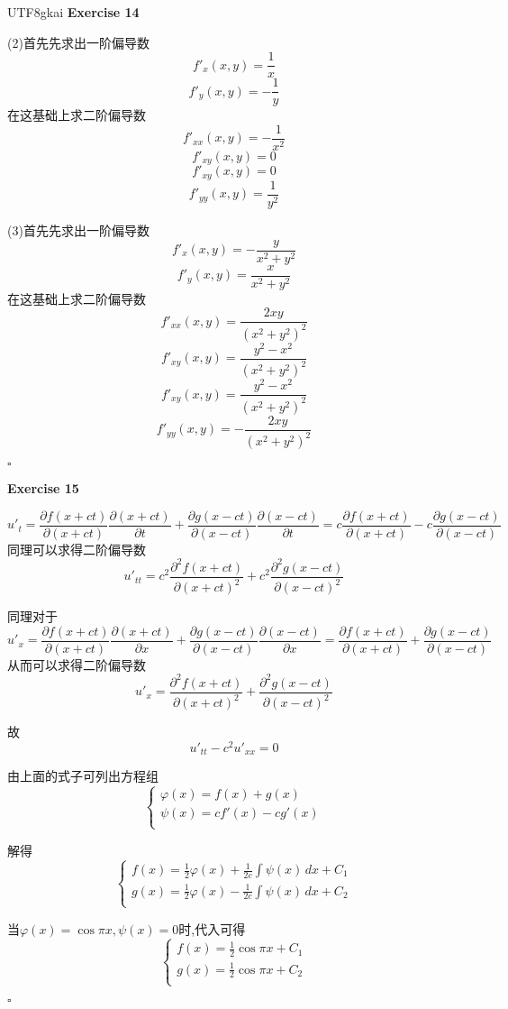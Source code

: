 \documentclass{article}
\newenvironment{exercise}[1]{%
{\textbf{Exercise #1} \\ 
    }
}{
  \hfill $\square$ 
  \par\bigskip 
}
\begin{document}
\begin{CJK}{UTF8}{gkai}
\begin{exercise}{14}
    (2)首先先求出一阶偏导数
    \[f'_x(x,y) = \frac{1}{x}\]
    \[f'_y(x,y) = -\frac{1}{y}\]
    在这基础上求二阶偏导数
    \[f'_{xx}(x,y) = -\frac{1}{x^2}\]
    \[f'_{xy}(x,y) = 0\]
    \[f'_{xy}(x,y) = 0\]
    \[f'_{yy}(x,y) = \frac{1}{y^2}\]

    (3)首先先求出一阶偏导数
    \[f'_x(x,y) = -\frac{y}{x^2 + y^2}\]
    \[f'_y(x,y) = \frac{x}{x^2 + y^2}\]
    在这基础上求二阶偏导数
    \[f'_{xx}(x,y) = \frac{2xy}{(x^2 + y^2)^2}\]
    \[f'_{xy}(x,y) = \frac{y^2 - x^2}{(x^2 + y^2)^2}\]
    \[f'_{xy}(x,y) = \frac{y^2 - x^2}{(x^2 + y^2)^2}\]
    \[f'_{yy}(x,y) = -\frac{2xy}{(x^2 + y^2)^2}\]    
\end{exercise}

\begin{exercise}{15}
    \[u'_t = \frac{\partial f(x + ct)}{\partial(x + ct)} \frac{\partial (x + ct)}{\partial t} + \frac{\partial g(x - ct)}{\partial(x - ct)} \frac{\partial (x - ct)}{\partial t} = c \frac{\partial f(x + ct)}{\partial(x + ct)} - c \frac{\partial g(x - ct)}{\partial(x - ct)}\]
    同理可以求得二阶偏导数
    \[u'_{tt} =  c^2 \frac{\partial^2 f(x + ct)}{\partial(x + ct)^2} + c^2 \frac{\partial^2 g(x - ct)}{\partial(x - ct)^2}\]

    同理对于
    \[u'_x = \frac{\partial f(x + ct)}{\partial(x + ct)} \frac{\partial (x + ct)}{\partial x} + \frac{\partial g(x - ct)}{\partial(x - ct)} \frac{\partial (x - ct)}{\partial x} = \frac{\partial f(x + ct)}{\partial(x + ct)} + \frac{\partial g(x - ct)}{\partial(x - ct)}\]
    从而可以求得二阶偏导数
    \[u'_x = \frac{\partial^2 f(x + ct)}{\partial(x + ct)^2} + \frac{\partial^2 g(x - ct)}{\partial(x - ct)^2}\]

    故
    \[u'_{tt} - c^2 u'_{xx} = 0\]

    由上面的式子可列出方程组
    \[\begin{cases}
        \varphi(x) = f(x) + g(x)\\
        \psi(x) = c f'(x) - c g'(x)\\
    \end{cases}\]

    解得
    \[\begin{cases}
        f(x) = \frac{1}{2} \varphi(x) + \frac{1}{2c} \int \psi(x)\, dx + C_1\\
        g(x) = \frac{1}{2} \varphi(x) - \frac{1}{2c} \int \psi(x)\, dx + C_2\\
    \end{cases}\]

    当$\varphi(x) = \cos \pi x,\psi(x) = 0$时,代入可得
    \[\begin{cases}
        f(x) = \frac{1}{2} \cos \pi x + C_1\\
        g(x) = \frac{1}{2} \cos \pi x + C_2\\
    \end{cases}\]


\end{exercise}
\end{CJK}
\end{document}
